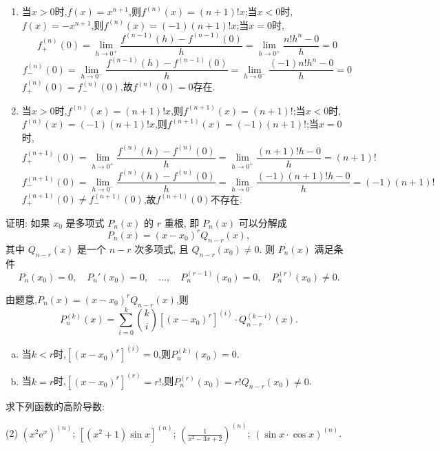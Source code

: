 \begin{solution}
    \begin{enumerate}
        \item 当$x>0$时,$f(x) = x^{n+1}$,则$f^{(n)}(x) = (n+1)! x$;当$x<0$时,$f(x) = -x^{n+1}$,则$f^{(n)}(x) = (-1) (n+1)! x$;当$x=0$时,
              $$f_+^{(n)}(0) = \lim_{h \to 0^+} \frac{f^{(n-1)}(h) - f^{(n-1)}(0)}{h} = \lim_{h \to 0^+} \frac{n! h^n - 0}{h} = 0 $$
              $$f_-^{(n)}(0) = \lim_{h \to 0^-} \frac{f^{(n-1)}(h) - f^{(n-1)}(0)}{h} = \lim_{h \to 0^-} \frac{(-1) n! h^n - 0}{h} = 0 $$
              $f_+^{(n)}(0) = f_-^{(n)}(0)$,故$f^{(n)}(0) = 0$存在.
        \item 当$x>0$时,$f^{(n)}(x) = (n+1)! x$,则$f^{(n+1)}(x) = (n+1)!$;当$x<0$时,$f^{(n)}(x) = (-1) (n+1)! x$,则$f^{(n+1)}(x) = (-1) (n+1)!$;当$x=0$时,
              $$f_+^{(n+1)}(0) = \lim_{h \to 0^+} \frac{f^{(n)}(h) - f^{(n)}(0)}{h} = \lim_{h \to 0^+} \frac{(n+1)! h - 0}{h} = (n+1)! $$
              $$f_-^{(n+1)}(0) = \lim_{h \to 0^-} \frac{f^{(n)}(h) - f^{(n)}(0)}{h} = \lim_{h \to 0^-} \frac{(-1) (n+1)! h - 0}{h} = (-1) (n+1)! $$
              $f_+^{(n+1)}(0) \neq f_-^{(n+1)}(0)$,故$f^{(n+1)}(0)$不存在.
    \end{enumerate}
\end{solution}

\begin{exercise}[3.1.21]
    证明: 如果 $x_0$ 是多项式 $P_n(x)$ 的 $r$ 重根, 即 $P_n(x)$ 可以分解成
    $$ P_n(x) = (x-x_0)^r Q_{n-r}(x), $$
    其中 $Q_{n-r}(x)$ 是一个 $n-r$ 次多项式, 且 $Q_{n-r}(x_0) \ne 0$. 则 $P_n(x)$ 满足条件
    $$ P_n(x_0)=0, \quad P_n'(x_0)=0, \quad \dots, \quad P_n^{(r-1)}(x_0)=0, \quad P_n^{(r)}(x_0) \ne 0. $$
\end{exercise}

\begin{solution}
    由题意,$P_n(x) = (x-x_0)^r Q_{n-r}(x)$,则
    $$P_n^{(k)}(x) = \sum_{i=0}^k \binom{k}{i} \left[ (x-x_0)^r \right]^{(i)} \cdot Q_{n-r}^{(k-i)}(x).$$
    \begin{enumerate}[(a)]
        \item 当$k < r$时,$\left[ (x-x_0)^r \right]^{(i)} = 0$,则$P_n^{(k)}(x_0) = 0$.
        \item 当$k = r$时,$\left[ (x-x_0)^r \right]^{(r)} = r!$,则$P_n^{(r)}(x_0) = r! Q_{n-r}(x_0) \neq 0$.
    \end{enumerate}

\end{solution}

\begin{exercise}[3.1.22]
    求下列函数的高阶导数:
    \begin{tasks}[label=(\arabic*)](2)
        \task $(x^2\mathrm{e}^x)^{(n)}$;
        \task $[(x^2+1)\sin x]^{(n)}$;
        \task $\left(\frac{1}{x^2-3x+2}\right)^{(n)}$;
        \task $(\sin x \cdot \cos x)^{(n)}$.
    \end{tasks}
\end{exercise}

